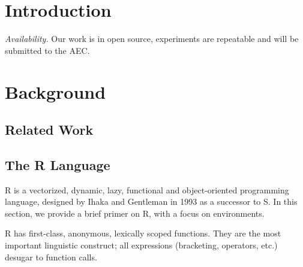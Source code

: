 \documentclass[10pt,review,sigplan,anonymous=true]{acmart}
\newcommand{\code}[1]{\lstinline |#1|\xspace}
\begin{document}
\section{Introduction}

{\small \medskip\noindent\emph{Availability.} Our work is in open source, experiments are
repeatable and will be submitted to the AEC.}

\section{Background}\label{sec:background}

\subsection{Related Work}


\subsection{The R Language}

R is a vectorized, dynamic, lazy, functional and object-oriented programming
language, designed by Ihaka and Gentleman in 1993 as a successor to S. In this
section, we provide a brief primer on R, with a focus on environments.

R has first-class, anonymous, lexically scoped functions. They are the most
important linguistic construct; all expressions (bracketing, operators, etc.)
desugar to function calls.
\end{document}
